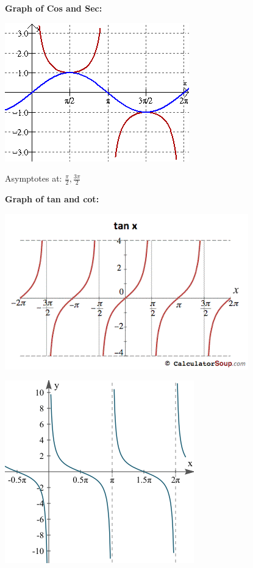 \documentclass{report}
\begin{document}
  \pagebreak \bigbreak \noindent
  \begin{mdframed}
    \textbf{Graph of Cos and Sec:} 
    \bigbreak \noindent 
    \begin{center}
      \includegraphics[scale=0.5]{ ./images/10.png}
    \end{center}
    \bigbreak \noindent 
    Asymptotes at: $\frac{\pi}{2}, \frac{3\pi}{2} $
  \end{mdframed}

  \bigbreak \noindent 
  \begin{mdframed}
    \textbf{Graph of tan and cot:}
    \bigbreak \noindent 
    \begin{center}
      \includegraphics[scale=0.5]{ ./images/11.png }
    \end{center}
    \bigbreak \noindent 
    \begin{center}
      \includegraphics[scale=0.6]{ ./images/12.png }
    \end{center}
  \end{mdframed}
\end{document}
